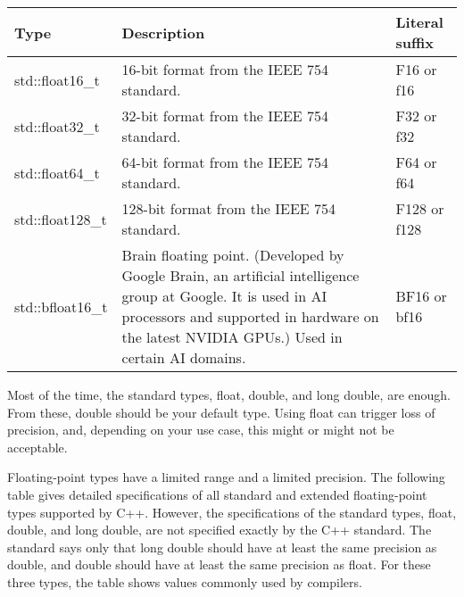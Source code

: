 \begin{longtable}{|l|l|l|}
\hline
\textbf{Type}    & \textbf{Description}                               & \textbf{Literal suffix} \\ \hline
\endfirsthead
%
\endhead
%
std::float16\_t  & 16-bit format from the IEEE 754 standard.          & F16 or f16              \\ \hline
std::float32\_t  & 32-bit format from the IEEE 754 standard.          & F32 or f32              \\ \hline
std::float64\_t  & 64-bit format from the IEEE 754 standard.          & F64 or f64              \\ \hline
std::float128\_t & 128-bit format from the IEEE 754 standard.         & F128 or f128            \\ \hline
std::bfloat16\_t & Brain floating point.
(Developed by Google Brain, an artificial intelligence group at Google. It is used in AI processors and supported in hardware on the latest NVIDIA GPUs.) Used in certain AI domains. & BF16 or bf16            \\ \hline
\end{longtable}

Most of the time, the standard types, float, double, and long double, are enough. From these, double should be your default type. Using float can trigger loss of precision, and, depending on your use case, this might or might not be acceptable.


Floating-point types have a limited range and a limited precision. The following table gives detailed specifications of all standard and extended floating-point types supported by C++. However, the specifications of the standard types, float, double, and long double, are not specified exactly by the C++ standard. The standard says only that long double should have at least the same precision as double, and double should have at least the same precision as float. For these three types, the table shows values commonly used by compilers.

